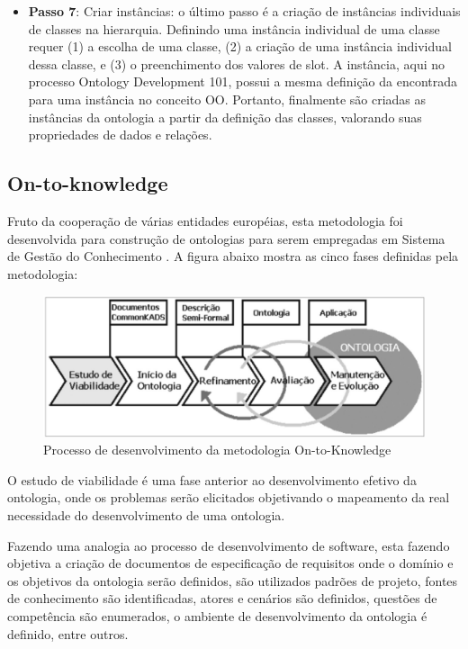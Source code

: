 \begin{itemize}
	\item \textbf{Passo 7}: Criar instâncias: o último passo é a criação de instâncias individuais de classes na hierarquia. Definindo uma instância individual de uma classe requer (1) a escolha de uma classe, (2) a criação de uma instância individual dessa classe, e (3) o preenchimento dos valores de slot. A instância, aqui no processo Ontology Development 101, possui a mesma definição da encontrada para uma instância no conceito OO. Portanto, finalmente são criadas as instâncias da ontologia a partir da definição das classes, valorando suas propriedades de dados e relações.
\end{itemize}

\subsection{On-to-knowledge}

Fruto da cooperação de várias entidades européias, esta metodologia foi desenvolvida para construção de ontologias para serem empregadas em Sistema de Gestão do Conhecimento \cite{STUDER}. A figura abaixo mostra as cinco fases definidas pela metodologia:

 \begin{figure}[ht]
	\centering
		\includegraphics[keepaspectratio=true,scale=0.5]{figuras/on-to-kon.eps}
	\caption{Processo de desenvolvimento da metodologia On-to-Knowledge}
	\label{ontoko}
\end{figure}

O estudo de viabilidade é uma fase anterior ao desenvolvimento efetivo da ontologia, onde os problemas serão elicitados objetivando o mapeamento da real necessidade do desenvolvimento de uma ontologia.

Fazendo uma analogia ao processo de desenvolvimento de software, esta fazendo objetiva a criação de documentos de especificação de requisitos onde o domínio e os objetivos da ontologia serão definidos, são utilizados padrões de projeto, fontes de conhecimento são identificadas, atores e cenários são definidos, questões de competência são enumerados, o ambiente de desenvolvimento da ontologia é definido, entre outros.

